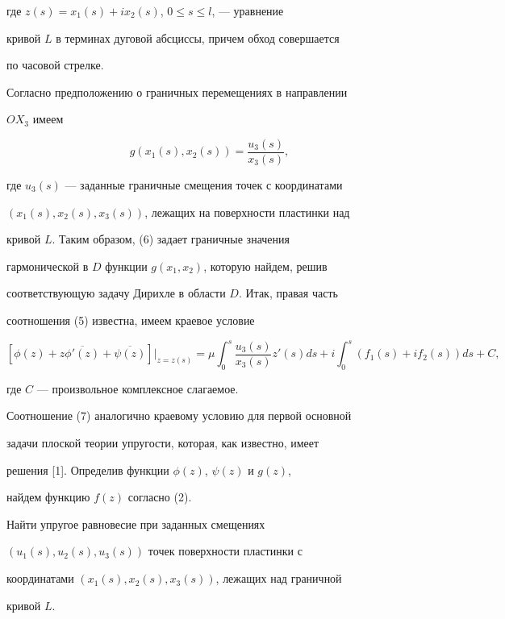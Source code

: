 где $z(s) = x_1(s) + i x_2(s)$, $0 \leq s \leq l$, --- уравнение


кривой $L$ в терминах дуговой абсциссы, причем обход совершается


по часовой стрелке.





Согласно предположению о граничных перемещениях в направлении


$OX_3$ имеем


\begin{equation}


g(x_1(s), x_2(s)) = \frac{u_3(s)}{x_3(s)},


\end{equation}


где $u_3(s)$ --- заданные граничные смещения точек с координатами


$(x_1(s),x_2(s),x_3(s))$, лежащих на поверхности пластинки над


кривой $L$. Таким образом, (6) задает граничные значения


гармонической в $D$ функции $g(x_1,x_2)$, которую найдем, решив


соответствующую задачу Дирихле в области $D$. Итак, правая часть


соотношения (5) известна, имеем краевое условие


\begin{equation}


[\phi(z) + z\overline{\phi'(z)} + \overline{\psi(z)}]\vert_{z =


z(s)} = \mu\int_0^s \frac{u_3(s)}{x_3(s)}z'(s) ds + i\int_0^s


(f_1(s) + i f_2(s)) ds + C,


\end{equation}


где $C$ --- произвольное комплексное слагаемое.





Соотношение (7) аналогично краевому условию для первой основной


задачи плоской теории упругости, которая, как известно, имеет


решения [1]. Определив функции $\phi(z)$, $\psi(z)$ и $g(z)$,


найдем функцию $f(z)$ согласно (2).





\begin{prob}


Найти упругое равновесие при заданных смещениях


$(u_1(s), u_2(s), u_3(s))$ точек поверхности пластинки с


координатами $(x_1(s), x_2(s), x_3(s))$, лежащих над граничной


кривой $L$.


\end{prob}





